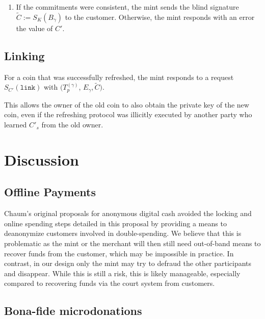 \documentclass{llncs}
\begin{document}
\begin{enumerate}
  \item \label{step:refresh-done} If the commitments were consistent,
    the mint sends the blind signature $\widetilde{C} :=
    S_{K}(B_\gamma)$ to the customer.  Otherwise, the mint responds
    with an error the value of $C'$.
\end{enumerate}

%

\subsection{Linking}

For a coin that was successfully refreshed, the mint responds to
a request $S_{C'}(\mathtt{link})$ with $(T^{(\gamma)}_p$, $E_{\gamma}, \widetilde{C})$.

This allows the owner of the old coin to also obtain the private key
of the new coin, even if the refreshing protocol was illicitly
executed by another party who learned $C'_s$ from the old owner.


\section{Discussion}

\subsection{Offline Payments}

Chaum's original proposals for anonymous digital cash avoided the
locking and online spending steps detailed in this proposal by
providing a means to deanonymize customers involved in
double-spending.  We believe that this is problematic as the mint or
the merchant will then still need out-of-band means to recover funds
from the customer, which may be impossible in practice.  In contrast,
in our design only the mint may try to defraud the other participants
and disappear.  While this is still a risk, this is likely manageable,
especially compared to recovering funds via the court system from
customers.


\subsection{Bona-fide microdonations}
\end{document}
